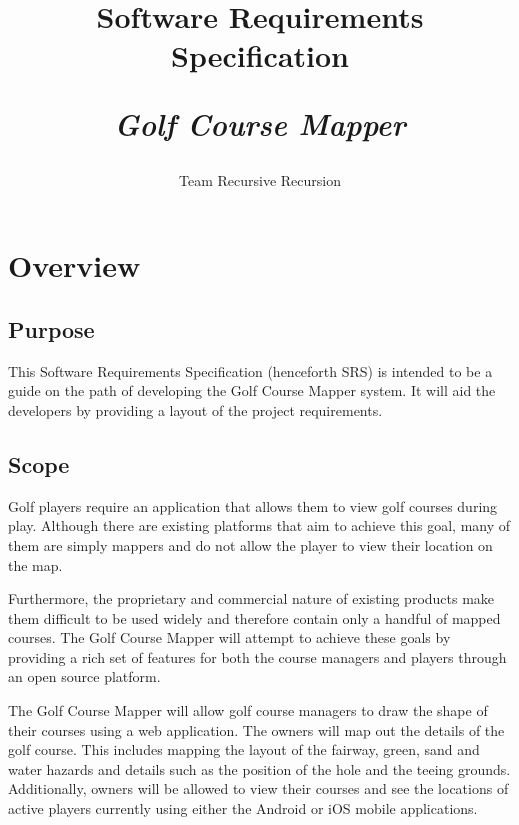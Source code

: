 \documentclass{article}
\title{
    Software Requirements Specification\\
    \begin{large}
        \textit{Golf Course Mapper}
    \end{large}
}
\date{
    \begin{small}
        \today
    \end{small}
}
\author{
    Team Recursive Recursion
}
\begin{document}
    \maketitle
    \newpage

    \tableofcontents
    \newpage


    
    \section{Overview}

    \subsection{Purpose}

    This Software Requirements Specification (henceforth SRS) is intended to be
    a guide on the path of developing the Golf Course Mapper system. It will
    aid the developers by providing a layout of the project requirements.

    \subsection{Scope}

    Golf players require an application that allows them to view golf courses
    during play. Although there are existing platforms that aim to achieve this
    goal, many of them are simply mappers and do not allow the player to view
    their location on the map.
    
    Furthermore, the proprietary and commercial nature of existing products
    make them difficult to be used widely and therefore contain only a handful
    of mapped courses. The Golf Course Mapper will attempt to achieve these
    goals by providing a rich set of features for both the course managers and
    players through an open source platform.

    The Golf Course Mapper will allow golf course managers to draw the shape of
    their courses using a web application. The owners will map out the details
    of the golf course. This includes mapping the layout of the fairway, green,
    sand and water hazards and details such as the position of the hole and the
    teeing grounds. Additionally, owners will be allowed to view their courses
    and see the locations of active players currently using either the Android
    or iOS mobile applications.
\end{document}

